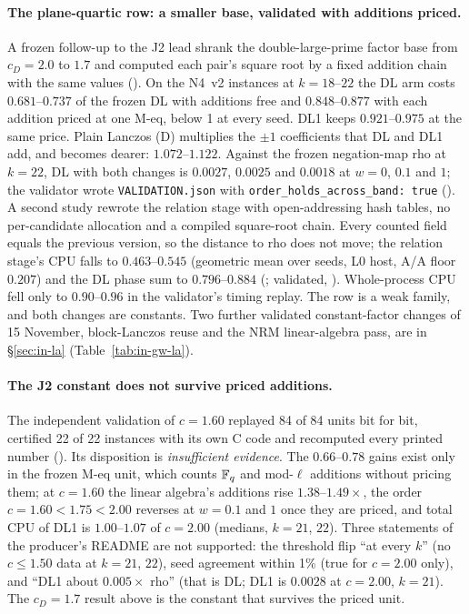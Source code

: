\paragraph{The plane-quartic row: a smaller base, validated with additions
priced.} A frozen follow-up to the J2 lead shrank the double-large-prime
factor base from $c_D=2.0$ to $1.7$ and computed each pair's square root by
a fixed addition chain with the same values
(). On the
N4~v2 instances at $k=18$--$22$ the DL arm costs $0.681$--$0.737$ of the
frozen DL with additions free and $0.848$--$0.877$ with each addition
priced at one M-eq, below 1 at every seed. DL1 keeps $0.921$--$0.975$ at
the same price. Plain Lanczos (D) multiplies the $\pm1$ coefficients that
DL and DL1 add, and becomes dearer: $1.072$--$1.122$. Against the frozen
negation-map rho at $k=22$, DL with both changes is $0.0027$, $0.0025$ and
$0.0018$ at $w=0$, $0.1$ and $1$; the validator wrote
\texttt{VALIDATION.json} with \texttt{order\_holds\_across\_band: true}
().
A second study rewrote the relation stage with open-addressing hash tables,
no per-candidate allocation and a compiled square-root chain. Every counted
field equals the previous version, so the distance to rho does not move;
the relation stage's CPU falls to $0.463$--$0.545$ (geometric mean over
seeds, L0 host, A/A floor $0.207$) and the DL phase sum to $0.796$--$0.884$
(; validated,
).
Whole-process CPU fell only to $0.90$--$0.96$ in the validator's timing
replay. The row is a weak family, and both changes are constants.
Two further validated constant-factor changes of 15 November, block-Lanczos
reuse and the NRM linear-algebra pass, are in \S\ref{sec:in-la}
(Table~\ref{tab:in-gw-la}).

\paragraph{The J2 constant does not survive priced additions.} The
independent validation of $c=1.60$ replayed 84 of 84 units bit for bit,
certified 22 of 22 instances with its own C code and recomputed every
printed number
().
Its disposition is \emph{insufficient evidence}. The $0.66$--$0.78$ gains
exist only in the frozen M-eq unit, which counts $\mathbb{F}_q$ and mod-$\ell$
additions without pricing them; at $c=1.60$ the linear algebra's additions
rise $1.38$--$1.49\times$, the order $c=1.60<1.75<2.00$ reverses at $w=0.1$
and $1$ once they are priced, and total CPU of DL1 is $1.00$--$1.07$ of
$c=2.00$ (medians, $k=21$, $22$). Three statements of the producer's
README are not supported: the threshold flip ``at every $k$'' (no
$c\le1.50$ data at $k=21$, $22$), seed agreement within 1\% (true for
$c=2.00$ only), and ``DL1 about $0.005\times$ rho'' (that is DL; DL1 is
$0.0028$ at $c=2.00$, $k=21$). The $c_D=1.7$ result above is the
constant that survives the priced unit.

